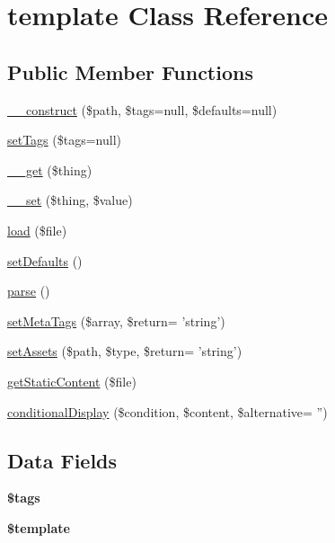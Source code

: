 \hypertarget{classtemplate}{\section{template Class Reference}
\label{classtemplate}
}
\subsection*{Public Member Functions}
\begin{DoxyCompactItemize}
\item 
\hyperlink{classtemplate_a4d8e4a324efce73096d5af1d4c143fdd}{\-\_\-\-\_\-construct} (\$path, \$tags=null, \$defaults=null)
\item 
\hyperlink{classtemplate_a182cb7b16d045c4aa1cbf6e0cd845933}{set\-Tags} (\$tags=null)
\item 
\hyperlink{classtemplate_aa36766cc96e8ead6a654535cd826cc92}{\-\_\-\-\_\-get} (\$thing)
\item 
\hyperlink{classtemplate_a1e08cf354600b2e56e93bd4f59636937}{\-\_\-\-\_\-set} (\$thing, \$value)
\item 
\hyperlink{classtemplate_aaa4e95f27857ab78defda3e0c0b7039b}{load} (\$file)
\item 
\hyperlink{classtemplate_ac900283b8780520c328c6457e34177f4}{set\-Defaults} ()
\item 
\hyperlink{classtemplate_a38d99acc70a1d8fd8f94455743b2d237}{parse} ()
\item 
\hyperlink{classtemplate_ad35591d0bad37abfb2074d5290c80e04}{set\-Meta\-Tags} (\$array, \$return= 'string')
\item 
\hyperlink{classtemplate_a94dbaa873d4f3a4dda41f5faa42d171b}{set\-Assets} (\$path, \$type, \$return= 'string')
\item 
\hyperlink{classtemplate_a4ee397e5785979b27b9eae8af6a434e1}{get\-Static\-Content} (\$file)
\item 
\hyperlink{classtemplate_a391db4247f8ebd4bdd6bae8032b0b42f}{conditional\-Display} (\$condition, \$content, \$alternative= '')
\end{DoxyCompactItemize}
\subsection*{Data Fields}
\begin{DoxyCompactItemize}
\item 
\hypertarget{classtemplate_a475a6a63b85186663d34151bcbd21590}{{\bfseries \$tags}}\label{classtemplate_a475a6a63b85186663d34151bcbd21590}

\item 
\hypertarget{classtemplate_aa3e9534005fd516d941f6a5569896e01}{{\bfseries \$template}}\label{classtemplate_aa3e9534005fd516d941f6a5569896e01}

\end{DoxyCompactItemize}


